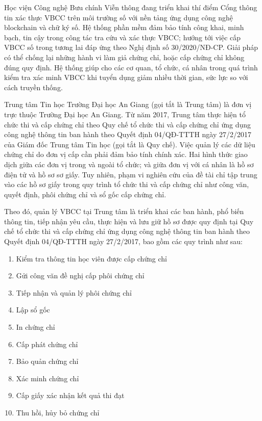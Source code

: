 Học viện Công nghệ Bưu chính Viễn thông đang triển khai thí điểm Cổng thông tin xác thực VBCC trên môi trường số với nền tảng ứng dụng công nghệ blockchain và chữ ký số. 
Hệ thống phần mềm đảm bảo tính công khai, minh bạch, tin cậy trong công tác tra cứu và xác thực VBCC; hướng tới việc cấp VBCC số trong tương lai đáp ứng theo Nghị định số 30/2020/NĐ-CP. 
Giải pháp có thể chống lại những hành vi làm giả chứng chỉ, hoặc cấp chứng chỉ không đúng quy định. 
Hệ thống giúp cho các cơ quan, tổ chức, cá nhân trong quá trình kiểm tra xác minh VBCC khi tuyển dụng giảm nhiều thời gian, sức lực so với cách truyền thống.

Trung tâm Tin học Trường Đại học An Giang (gọi tắt là Trung tâm) là đơn vị trực thuộc Trường Đại học An Giang. 
Từ năm 2017, Trung tâm thực hiện tổ chức thi và cấp chứng chỉ theo Quy chế tổ chức thi và cấp chứng chỉ ứng dụng công nghệ thông tin ban hành theo Quyết định 04/QĐ-TTTH ngày 27/2/2017 của Giám đốc Trung tâm Tin học (gọi tắt là Quy chế). Việc quản lý các dữ liệu chứng chỉ do đơn vị cấp cần phải đảm bảo tính chính xác. 
Hai hình thức giao dịch giữa các đơn vị trong và ngoài tổ chức; và giữa đơn vị với cá nhân là hồ sơ điện tử và hồ sơ sơ giấy. 
Tuy nhiên, phạm vi nghiên cứu của đề tài chỉ tập trung vào các hồ sơ giấy trong quy trình tổ chức thi và cấp chứng chỉ như công văn, quyết định, phôi chứng chỉ và sổ gốc cấp chứng chỉ.

Theo đó, quản lý VBCC tại Trung tâm là triển khai các ban hành, phổ biến thông tin, tiếp nhận yêu cầu, thực hiện và lưu giữ hồ sơ được quy định tại Quy chế tổ chức thi và cấp chứng chỉ ứng dụng công nghệ thông tin ban hành theo Quyết định 04/QĐ-TTTH ngày 27/2/2017, bao gồm các quy trình như sau:

\begin{enumerate}
\item Kiểm tra thông tin học viên được cấp chứng chỉ
\item Gửi công văn đề nghị cấp phôi chứng chỉ
\item Tiếp nhận và quản lý phôi chứng chỉ
\item Lập sổ gốc
\item In chứng chỉ
\item Cấp phát chứng chỉ
\item Bảo quản chứng chỉ
\item Xác minh chứng chỉ
\item Cấp giấy xác nhận kết quả thi đạt
\item Thu hồi, hủy bỏ chứng chỉ
\end{enumerate}

